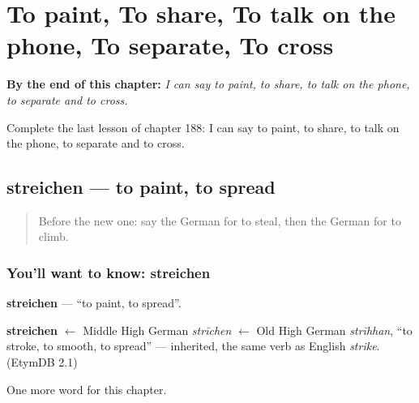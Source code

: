 
\chapter{To paint, To share, To talk on the phone, To separate, To cross}
\label{ch:ge-to-paint-to-share-to-talk-on-the-phone-to-separate-to-cross}

\begin{chapteropening}
\textbf{By the end of this chapter:} \emph{I can say to paint, to share, to talk on the phone, to separate and to cross.}

Complete the last lesson of chapter 188: I can say to paint, to share, to talk on the phone, to separate and to cross.
\end{chapteropening}

\section[streichen]{streichen — to paint, to spread}

\label{lesson:GE-C188-streichen}



\begin{quote}
Before the new one: say the German for to steal, then the German for to climb.
\end{quote}

\subsection*{You'll want to know: streichen}
\textbf{streichen} — \textquotedblleft{}to paint, to spread\textquotedblright{}.

\begin{cousinweb}
\textbf{streichen} $\leftarrow$ Middle High German \emph{strīchen} $\leftarrow$ Old High German \emph{strīhhan}, \textquotedblleft{}to stroke, to smooth, to spread\textquotedblright{} — inherited, the same verb as English \emph{strike}. (EtymDB 2.1)
\end{cousinweb}

\begin{grammarlens}[title={What you've built}]
One more word for this chapter.
\end{grammarlens}

